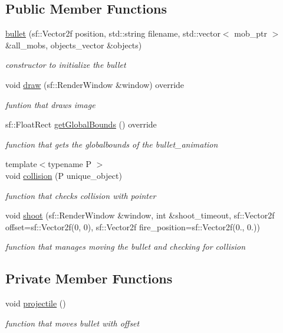 \subsection*{Public Member Functions}
\begin{DoxyCompactItemize}
\item 
\hyperlink{classbullet_a2c8b1e868ab8fe8edf43fc289f8d80b8}{bullet} (sf\+::\+Vector2f position, std\+::string filename, std\+::vector$<$ mob\+\_\+ptr $>$ \&all\+\_\+mobs, objects\+\_\+vector \&objects)
\begin{DoxyCompactList}\small\item\em constructor to initialize the bullet \end{DoxyCompactList}\item 
void \hyperlink{classbullet_ae999b952538687d45ca2ae54164a5cd8}{draw} (sf\+::\+Render\+Window \&window) override
\begin{DoxyCompactList}\small\item\em funtion that draws image \end{DoxyCompactList}\item 
sf\+::\+Float\+Rect \hyperlink{classbullet_a87bda5887249e8e37c5579180449bd93}{get\+Global\+Bounds} () override
\begin{DoxyCompactList}\small\item\em function that gets the globalbounds of the bullet\+\_\+animation \end{DoxyCompactList}\item 
{\footnotesize template$<$typename P $>$ }\\void \hyperlink{classbullet_ab7e5c677bbd642df24a2251bb58249b7}{collision} (P unique\+\_\+object)
\begin{DoxyCompactList}\small\item\em function that checks collision with pointer \end{DoxyCompactList}\item 
void \hyperlink{classbullet_a52d736cad2a486a65c8a25781cff1f70}{shoot} (sf\+::\+Render\+Window \&window, int \&shoot\+\_\+timeout, sf\+::\+Vector2f offset=sf\+::\+Vector2f(0, 0), sf\+::\+Vector2f fire\+\_\+position=sf\+::\+Vector2f(0., 0.))
\begin{DoxyCompactList}\small\item\em function that manages moving the bullet and checking for collision \end{DoxyCompactList}\end{DoxyCompactItemize}
\subsection*{Private Member Functions}
\begin{DoxyCompactItemize}
\item 
void \hyperlink{classbullet_a1f2cd5b7fa4d4beae1d27c06bc54f8c0}{projectile} ()
\begin{DoxyCompactList}\small\item\em function that moves bullet with offset \end{DoxyCompactList}\end{DoxyCompactItemize}
